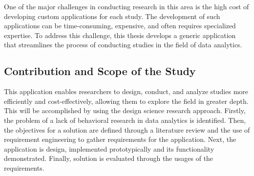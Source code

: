  One of the major challenges in conducting research in this area is the high cost of developing custom applications for each study. The development of such applications can be time-consuming, expensive, and often requires specialized expertise. To address this challenge, this thesis develops a generic application that streamlines the process of conducting studies in the field of data analytics.

\subsection{Contribution and Scope of the Study}

This application enables researchers to design, conduct, and analyze studies more efficiently and cost-effectively, allowing them to explore the field in greater depth. This will be accomplished by using the design science research approach. Firstly, the problem of a lack of behavioral research in data analytics is identified. Then, the objectives for a solution are defined through a literature review and the use of requirement engineering to gather requirements for the application. Next, the application is design, implemented prototypically and its functionality demonstrated. Finally, solution is evaluated through the usages of the requirements.



